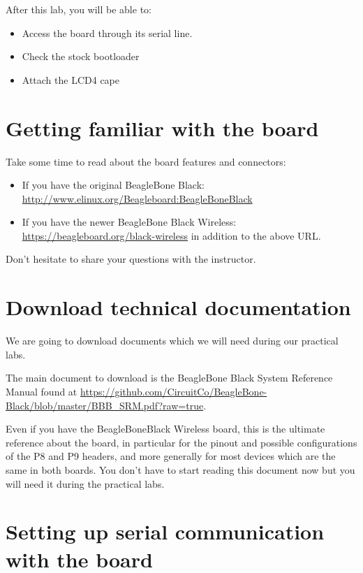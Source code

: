 
After this lab, you will be able to:
\begin{itemize}
\item Access the board through its serial line.
\item Check the stock bootloader
\item Attach the LCD4 cape
\end{itemize}

\section{Getting familiar with the board}

Take some time to read about the board features and connectors:

\begin{itemize}
   \item If you have the original BeagleBone Black:\\
         \url{http://www.elinux.org/Beagleboard:BeagleBoneBlack}
   \item If you have the newer BeagleBone Black Wireless:\\
         \url{https://beagleboard.org/black-wireless} in addition to the above URL.
\end{itemize}

Don't hesitate to share your questions with the instructor.

\section{Download technical documentation}

We are going to download documents which we will need during our
practical labs.

The main document to download is the BeagleBone Black System Reference Manual found at
\url{https://github.com/CircuitCo/BeagleBone-Black/blob/master/BBB_SRM.pdf?raw=true}.

Even if you have the BeagleBoneBlack Wireless board, this is the
ultimate reference about the board, in particular for the pinout and
possible configurations of the P8 and P9 headers, and more generally
for most devices which are the same in both boards.
You don't have to start reading this document now but you will need it
during the practical labs.

\section{Setting up serial communication with the board}

